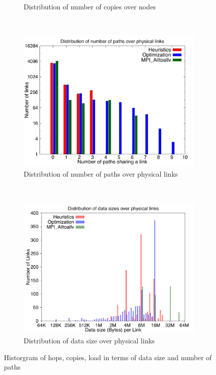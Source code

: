 \documentclass[letter]{article}
\begin{document}
\begin{figure}
\begin{subfigure}[b]{0.5\textwidth}
                \caption{Distribution of number of copies over nodes}
                \label{fig:tiger}
        \end{subfigure}
        ~ %
        \begin{subfigure}[b]{0.5\textwidth}
                \includegraphics[width=\textwidth]{report_figures/loadpath_histo.pdf}
                \caption{Distribution of number of paths over physical links}
                \label{fig:mouse}
        \end{subfigure}
	~ %
	\begin{subfigure}[b]{0.6\textwidth}
                \includegraphics[width=\textwidth]{report_figures/loaddata_histo.pdf}
                \caption{Distribution of data size over physical links}
                \label{fig:mouse}
        \end{subfigure}
        \caption{Historgram of hops, copies, load in terms of data size and number of paths}\label{fig:animals}
\end{figure}
\end{document}
